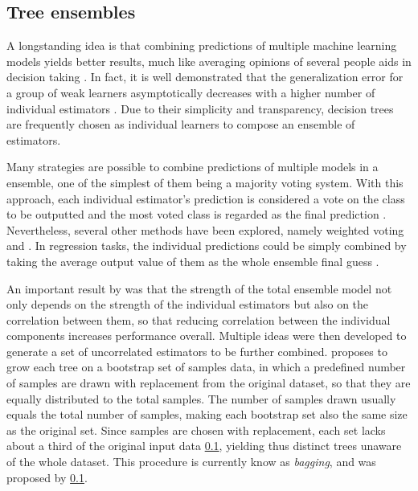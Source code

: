 \documentclass[conference]{IEEEtran}
\begin{document}
%


\subsection{Tree ensembles}

A longstanding idea is that combining predictions of multiple machine learning models yields better results, much like averaging opinions of several people aids in decision taking \cite{}. In fact, it is well demonstrated that the generalization error for a group of weak learners asymptotically decreases with a higher number of individual estimators \cite{}. Due to their simplicity and transparency, decision trees are frequently chosen as individual learners to compose an ensemble of estimators.

Many strategies are possible to combine predictions of multiple models in a ensemble, one of the simplest of them being a majority voting system. With this approach, each individual estimator's prediction is considered a vote on the class to be outputted and the most voted class is regarded as the final prediction \cite{}. Nevertheless, several other methods have been explored, namely weighted voting \cite{} and {} \cite{Fawagreh_2014}. In regression tasks, the individual predictions could be simply combined by taking the average output value of them as the whole ensemble final guess \cite{}.


An important result by \cite{Breiman_2001} was that the strength of the total ensemble model not only depends on the strength of the individual estimators but also on the correlation between them, so that reducing correlation between the individual components increases performance overall. Multiple ideas were then developed to generate a set of uncorrelated estimators to be further combined. \cite{} proposes to grow each tree on a bootstrap set of samples data, in which a predefined number of samples are drawn with replacement from the original dataset, so that they are equally distributed to the total samples. The number of samples drawn usually equals the total number of samples, making each bootstrap set also the same size as the original set. Since samples are chosen with replacement, each set lacks about a third of the original input data \ref{}, yielding thus distinct trees unaware of the whole dataset. This procedure is currently know as \emph{bagging}, and was proposed by \ref{}.
\end{document}
